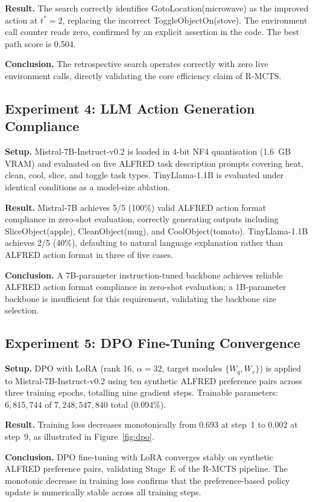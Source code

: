 \documentclass[pdflatex,sn-mathphys-num]{sn-jnl}
\theoremstyle{thmstyleone}
\theoremstyle{thmstyletwo}
\theoremstyle{thmstylethree}
\newcommand{\RMCTS}{\textsc{R-MCTS}}
\begin{document}
\textbf{Result.}
The search correctly identifies GotoLocation(microwave) as the improved
action at $t^*=2$, replacing the incorrect ToggleObjectOn(stove).
The environment call counter reads zero, confirmed by an explicit
assertion in the code. The best path score is 0.504.

\textbf{Conclusion.}
The retrospective search operates correctly with zero live environment
calls, directly validating the core efficiency claim of \RMCTS{}.

\FloatBarrier
\subsection{Experiment 4: LLM Action Generation Compliance}

\textbf{Setup.}
Mistral-7B-Instruct-v0.2 is loaded in 4-bit NF4 quantisation
(1.6~GB VRAM) and evaluated on five ALFRED task description prompts
covering heat, clean, cool, slice, and toggle task types.
TinyLlama-1.1B is evaluated under identical conditions as a
model-size ablation.

\textbf{Result.}
Mistral-7B achieves 5/5 (100\%) valid ALFRED action format compliance
in zero-shot evaluation, correctly generating outputs including
SliceObject(apple), CleanObject(mug), and CoolObject(tomato).
TinyLlama-1.1B achieves 2/5 (40\%), defaulting to natural language
explanation rather than ALFRED action format in three of five cases.

\textbf{Conclusion.}
A 7B-parameter instruction-tuned backbone achieves reliable ALFRED
action format compliance in zero-shot evaluation; a 1B-parameter
backbone is insufficient for this requirement, validating the backbone
size selection.

\FloatBarrier
\subsection{Experiment 5: DPO Fine-Tuning Convergence}

\textbf{Setup.}
DPO with LoRA (rank 16, $\alpha=32$, target modules $\{W_q,W_v\}$)
is applied to Mistral-7B-Instruct-v0.2 using ten synthetic ALFRED
preference pairs across three training epochs, totalling nine gradient
steps. Trainable parameters: $6{,}815{,}744$ of $7{,}248{,}547{,}840$
total (0.094\%).

\textbf{Result.}
Training loss decreases monotonically from 0.693 at step~1 to 0.002
at step~9, as illustrated in Figure~\ref{fig:dpo}.

\textbf{Conclusion.}
DPO fine-tuning with LoRA converges stably on synthetic ALFRED
preference pairs, validating Stage~E of the \RMCTS{} pipeline.
The monotonic decrease in training loss confirms that the
preference-based policy update is numerically stable across all
training steps.
\end{document}
